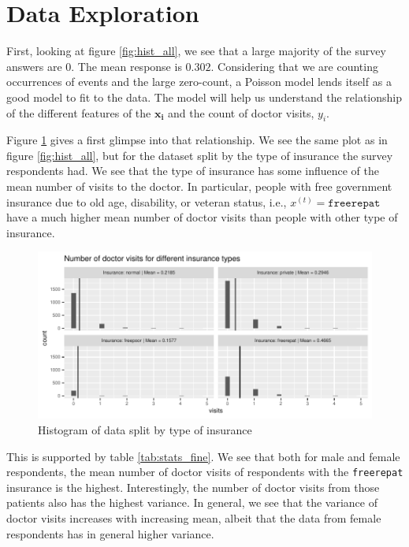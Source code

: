 \documentclass[a4paper,11pt]{article}
\begin{document}
\section{Data Exploration}
First, looking at figure \ref{fig:hist_all}, we see that a large majority of the survey answers are $0$. The mean response is $0.302$. Considering that we are counting occurrences of events and the large zero-count, a Poisson model lends itself as a good model to fit to the data. The model will help us understand the relationship of the different features of the $\mathbf{x_i}$ and the count of doctor visits, $y_i$.

Figure \ref{fig:hist_insurances} gives a first glimpse into that relationship. We see the same plot as in figure \ref{fig:hist_all}, but for the dataset split by the type of insurance the survey respondents had. We see that the type of insurance has some influence of the mean number of visits to the doctor. In particular, people with free government insurance due to old age, disability, or veteran status, i.e., $x^{(t)} = \texttt{freerepat}$ have a much higher mean number of doctor visits than people with other type of insurance. 

\begin{figure}[h]
	\centering
\includegraphics{../plots/histograms_of_insurances.pdf}
		\caption{Histogram of data split by type of insurance}
			\label{fig:hist_insurances}
\end{figure}

This is supported by table \ref{tab:stats_fine}. We see that both for male and female respondents, the mean number of doctor visits of respondents with the \texttt{freerepat} insurance is the highest. Interestingly, the number of doctor visits from those patients also has the highest variance. In general, we see that the variance of doctor visits increases with increasing mean, albeit that the data from female respondents has in general higher variance.
\end{document}
